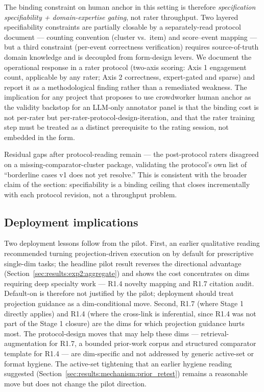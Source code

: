 The binding constraint on human anchor in this setting is therefore \emph{specification specifiability + domain-expertise gating}, not rater throughput. Two layered specifiability constraints are partially closable by a separately-read protocol document --- counting convention (cluster vs.\ item) and score--event mapping --- but a third constraint (per-event correctness verification) requires source-of-truth domain knowledge and is decoupled from form-design levers. We document the operational response in a rater protocol (two-axis scoring: Axis 1 engagement count, applicable by any rater; Axis 2 correctness, expert-gated and sparse) and report it as a methodological finding rather than a remediated weakness. The implication for any project that proposes to use crowdworker human anchor as the validity backstop for an LLM-only annotator panel is that the binding cost is not per-rater but per-rater-protocol-design-iteration, and that the rater training step must be treated as a distinct prerequisite to the rating session, not embedded in the form.

Residual gaps after protocol-reading remain --- the post-protocol raters disagreed on a missing-comparator-cluster package, validating the protocol's own list of ``borderline cases v1 does not yet resolve.'' This is consistent with the broader claim of the section: specifiability is a binding ceiling that closes incrementally with each protocol revision, not a throughput problem.

\subsection{Deployment implications}
\label{sec:discussion:deployment}

Two deployment lessons follow from the pilot. First, an earlier qualitative reading recommended turning projection-driven execution on by default for prescriptive single-dim tasks; the headline pilot result reverses the directional advantage (Section~\ref{sec:results:exp2:aggregate}) and shows the cost concentrates on dims requiring deep specialty work --- R1.4 novelty mapping and R1.7 citation audit. Default-on is therefore not justified by the pilot; deployment should treat projection guidance as a dim-conditional move. Second, R1.7 (where Stage 1 directly applies) and R1.4 (where the cross-link is inferential, since R1.4 was not part of the Stage 1 closure) are the dims for which projection guidance hurts most. The protocol-design moves that may help these dims --- retrieval-augmentation for R1.7, a bounded prior-work corpus and structured comparator template for R1.4 --- are dim-specific and not addressed by generic active-set or format hygiene. The active-set tightening that an earlier hygiene reading suggested (Section~\ref{sec:results:mechanism:prior_retest}) remains a reasonable move but does not change the pilot direction.
